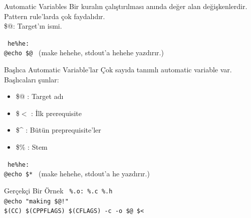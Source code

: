 \documentclass{beamer}
\begin{document}
\begin{frame}
    {Automatic Variables}
    Bir kuralın çalıştırılması anında değer alan değişkenlerdir.\\
    Pattern rule'larda çok faydalıdır.\\
    \vspace{5mm}
    \$@: Target'ın ismi.
        \vspace{3mm}

    \texttt{%
        he\%he:\\
        \hspace{10mm} @echo \$@
        }
        \vspace{5mm} (make hehehe, stdout'a hehehe yazdırır.)
    
\end{frame}

\begin{frame}
    {Başlıca Automatic Variable'lar}
    Çok sayıda tanımlı automatic variable var. Başlıcaları şunlar:
    \begin{itemize}
            \item \$@ : Target adı  \\
            \item \$$<$ : İlk prerequisite \\
            \item \$\^{} : Bütün preprequisite'ler \\
            \item \$\% : Stem  \\
        
    \end{itemize}
\vspace{5mm} 
    \texttt{%
        he\%he:\\
        \hspace{10mm} @echo \$*
        }
        \vspace{5mm} (make hehehe, stdout'a he yazdırır.)
    
\end{frame}

\begin{frame}
    {Gerçekçi Bir Örnek}
    \texttt{%
        \%.o: \%.c \%.h\\
        \hspace{10mm} @echo "making \$@!" \\ 
        \hspace{10mm} \$(CC) \$(CPPFLAGS) \$(CFLAGS) -c -o \$@  \$<\\ 
        }

    
\end{frame}
\end{document}
